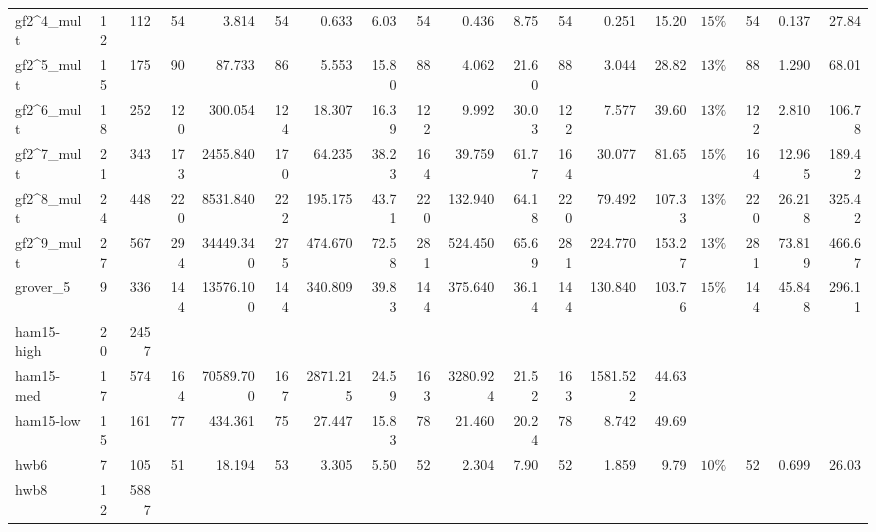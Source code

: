 \begin{table}[htbp]
\begin{tabular}{l c r | r r | r r r | r r r | r r r | c r r r}
gf2\textasciicircum4_mult & 12 & 112 & \cellcolor{bestT}54 & 3.814 & \cellcolor{bestT}54 & 0.633 & 6.03 & \cellcolor{bestT}54 & 0.436 & 8.75 & \cellcolor{bestT}54 & 0.251 & 15.20 & $15\%$ & \cellcolor{bestT}54 & \cellcolor{bestTime}0.137 & 27.84 \\
gf2\textasciicircum5_mult & 15 & 175 & 90 & 87.733 & \cellcolor{bestT}86 & 5.553 & 15.80 & 88 & 4.062 & 21.60 & 88 & 3.044 & 28.82 & $13\%$ & 88 & \cellcolor{bestTime}1.290 & 68.01 \\
gf2\textasciicircum6_mult & 18 & 252 & \cellcolor{bestT}120 & 300.054 & 124 & 18.307 & 16.39 & 122 & 9.992 & 30.03 & 122 & 7.577 & 39.60 & $13\%$ & 122 & \cellcolor{bestTime}2.810 & 106.78 \\
gf2\textasciicircum7_mult & 21 & 343 & 173 & 2455.840 & 170 & 64.235 & 38.23 & \cellcolor{bestT}164 & 39.759 & 61.77 & \cellcolor{bestT}164 & 30.077 & 81.65 & $15\%$ & \cellcolor{bestT}164 & \cellcolor{bestTime}12.965 & 189.42 \\
gf2\textasciicircum8_mult & 24 & 448 & \cellcolor{bestT}220 & 8531.840 & 222 & 195.175 & 43.71 & \cellcolor{bestT}220 & 132.940 & 64.18 & \cellcolor{bestT}220 & 79.492 & 107.33 & $13\%$ & \cellcolor{bestT}220 & \cellcolor{bestTime}26.218 & 325.42 \\
gf2\textasciicircum9_mult & 27 & 567 & 294 & 34449.340 & \cellcolor{bestT}275 & 474.670 & 72.58 & 281 & 524.450 & 65.69 & 281 & 224.770 & 153.27 & $13\%$ & 281 & \cellcolor{bestTime}73.819 & 466.67 \\
grover_5 & 9 & 336 & \cellcolor{bestT}144 & 13576.100 & \cellcolor{bestT}144 & 340.809 & 39.83 & \cellcolor{bestT}144 & 375.640 & 36.14 & \cellcolor{bestT}144 & 130.840 & 103.76 & $15\%$ & \cellcolor{bestT}144 & \cellcolor{bestTime}45.848 & 296.11 \\
ham15-high & 20 & 2457 &  &  &  &  &  &  &  &  &  &  &  &  &  &  &  \\
ham15-med & 17 & 574 & 164 & 70589.700 & 167 & 2871.215 & 24.59 & \cellcolor{bestT}163 & 3280.924 & 21.52 & \cellcolor{bestT}163 & 1581.522 & 44.63 &  &  &  &  \\
ham15-low & 15 & 161 & 77 & 434.361 & \cellcolor{bestT}75 & 27.447 & 15.83 & 78 & 21.460 & 20.24 & 78 & 8.742 & 49.69 &  &  &  &  \\
hwb6 & 7 & 105 & \cellcolor{bestT}51 & 18.194 & 53 & 3.305 & 5.50 & 52 & 2.304 & 7.90 & 52 & 1.859 & 9.79 & $10\%$ & 52 & \cellcolor{bestTime}0.699 & 26.03 \\
hwb8 & 12 & 5887 &  &  &  &  &  &  &  &  &  &  &  &  &  &  &  \\

\end{tabular}
\end{table}
